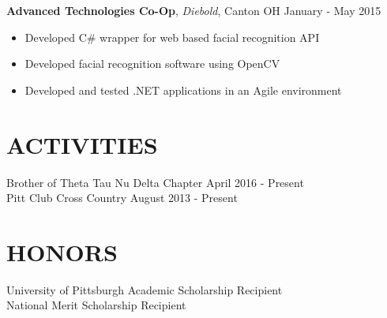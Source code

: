\documentclass[line, margin]{res}
\begin{document}
\begin{resume}
    \textbf{Advanced Technologies Co-Op}, \textit{Diebold}, Canton OH \hfill January - May 2015 \\
    \begin{itemize}
        \item Developed C\# wrapper for web based facial recognition API
        \item Developed facial recognition software using OpenCV
        \item Developed and tested .NET applications in an Agile environment
    \end{itemize}

    \section{ACTIVITIES}
    Brother of Theta Tau Nu Delta Chapter \hfill April 2016 - Present \\
    Pitt Club Cross Country \hfill August 2013 - Present

    \section{HONORS}
    University of Pittsburgh Academic Scholarship Recipient \\
    National Merit Scholarship Recipient


\end{resume}
\end{document}
